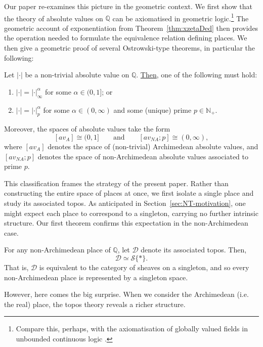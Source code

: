 \documentclass[a4paper, 11pt,reqno]{amsart}
\newcommand{\calD}{{\mathcal{D}}}
\newcommand{\baseS}{\mathcal{S}}
\newcommand{\Q}{\mathbb{Q}}
\newcommand{\gav}{{|\cdot|}}
\begin{document}
Our paper \cite{NVOstrowski} re-examines this picture in the geometric context. We first show that the theory of absolute values on $\Q$ can be axiomatised in geometric logic.\footnote{Compare this, perhaps, with the axiomatisation of globally valued fields in unbounded continuous logic \cite{GVF}.} The geometric account of exponentiation from Theorem~\ref{thm:xzetaDed} then provides the operation needed to formulate the equivalence relation defining places. We then give a geometric proof of several Ostrowski-type theorems, in particular the following:

\begin{maintheorem}\label{thm:ostrowskiQ} Let $\gav$ be a non-trivial absolute value on $\mathbb{Q}$. 
\underline{Then}, one of the following must hold:
	\begin{enumerate}[label=(\roman*)]
		\item $\gav=\gav^\alpha_{\infty}$ for some $\alpha\in(0,1]$; or
		\item $\gav=\gav_p^\alpha$ for some $\alpha\in (0,\infty)$ and some (unique) prime $p\in\mathbb{N}_+$. 
	\end{enumerate} 
Moreover, the spaces of absolute values take the form
 $$[av_A]\cong (0,1]\qquad \text{and}\qquad [av_{NA};p]\cong (0,\infty),$$ where $[av_A]$ denotes the space of (non-trivial) Archimedean absolute values, and $[av_{NA};p]$ denotes the space of non-Archimedean absolute values associated to prime $p$.
\end{maintheorem}

This classification frames the strategy of the present paper. Rather than constructing the entire space of places at once, we first isolate a single place and study its associated topos. As anticipated in Section~\ref{sec:NT-motivation}, one might expect each place to correspond to a singleton, carrying no further intrinsic structure. Our first theorem confirms this expectation in the non-Archimedean case. 

\begin{maintheorem}\label{thm:thmC} For any non-Archimedean place of $\Q$, let $\calD$ denote its associated topos. Then, 
	$$\mathcal{D}\simeq\baseS\{\ast\}.$$
That is, $\calD$ is equivalent to the category of sheaves on a singleton, and so every non-Archimedean place is represented by a singleton space.
\end{maintheorem}

However, here comes the big surprise. When we consider the Archimedean (i.e. the real) place, the topos theory reveals a richer structure.
\end{document}

